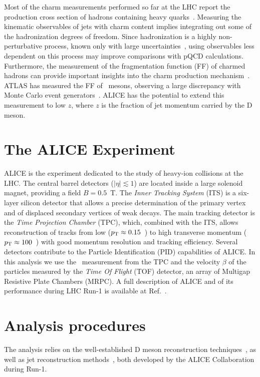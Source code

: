\documentclass[a4paper]{jpconf}
\begin{document}
Most of the charm measurements performed so far at the LHC report the production cross section of hadrons
containing heavy quarks~\cite{ALICE:2012d, LHCb:2013a, ATLAS:2016a, ALICE:2016b}.
Measuring the kinematic observables of jets with charm content implies integrating out some of the hadronization degrees of freedom. 
Since hadronization is a highly non-perturbative process, known only with large uncertainties~\cite{dEnterria:2014}, 
using observables less dependent on this process may improve comparisons with pQCD calculations.
Furthermore, the measurement of the fragmentation function (FF) of charmed hadrons 
can provide important insights into the charm production mechanism~\cite{CDF:1990, UA1:1990, STAR:2009a}.
ATLAS has measured the FF of \Dstar\ mesons, observing a large discrepancy with Monte Carlo
event generators~\cite{ATLAS:2012d}. ALICE has the potential to extend this measurement to low $z$, where $z$ is the fraction
of jet momentum carried by the D meson.

\section{The ALICE Experiment}
ALICE is the experiment dedicated to the study of heavy-ion collisions at the LHC.
The central barrel detectors ($\lvert \eta\rvert \lesssim 1$) are located inside a large solenoid magnet, providing a
field $B = 0.5$~T.
The \emph{Inner Tracking System} (ITS) is a six-layer silicon detector that allows a precise determination of the primary vertex 
and of displaced secondary vertices of weak decays.
The main tracking detector is the \emph{Time Projection Chamber} (TPC), which, combined with the ITS, allows reconstruction of tracks 
from low ($p_{\rm T}\approx0.15$~\GeVc) to high transverse momentum
($p_{\rm T}\approx100$~\GeVc) with good momentum resolution and tracking efficiency.
Several detectors contribute to the Particle Identification (PID) capabilities of ALICE. 
In this analysis we use the \dedx\ measurement from the TPC and
the velocity $\beta$ of the particles measured by the \emph{Time Of Flight} (TOF) detector,
an array of Multigap Resistive Plate Chambers (MRPC).
A full description of ALICE and of its performance during LHC Run-1 is available at Ref.~\cite{ALICE:2014b}.

\section{Analysis procedures}
The analysis relies on the well-established D meson reconstruction techniques~\cite{ALICE:2012d, ALICE:2016a}, as well as
jet reconstruction methods~\cite{ALICE:2013c, ALICE:2015a, ALICE:2015e}, both developed by the ALICE Collaboration during Run-1.
\end{document}
